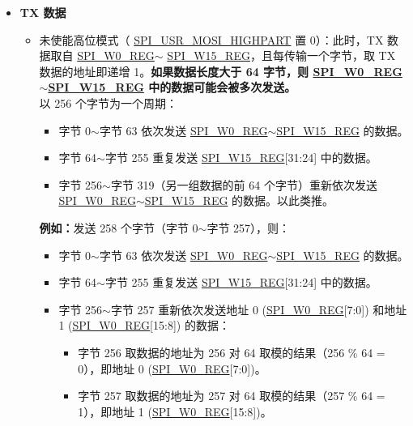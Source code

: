 \documentclass[main\_\_CN.tex]{subfiles}
\begin{document}
\begin{itemize}
    \item \textbf{TX 数据}
    \begin{itemize}
        \item 未使能高位模式（ \hyperref[fielddesc:SPIUSRMOSIHIGHPART]{SPI\_USR\_MOSI\_HIGHPART} 置 0）：此时，TX 数据取自 \hyperref[regdesc:SPIW0REG]{SPI\_W0\_REG}$\sim$ \hyperref[regdesc:SPIW15REG]{SPI\_W15\_REG}，且每传输一个字节，取 TX 数据的地址即递增 1。\textbf{如果数据长度大于 64 字节，则 \hyperref[regdesc:SPIW0REG]{SPI\_W0\_REG}$\sim$\hyperref[regdesc:SPIW15REG]{SPI\_W15\_REG} 中的数据可能会被多次发送。}\\
       以 256 个字节为一个周期：
        \begin{itemize}
            \item 字节 0$\sim$字节 63 依次发送 \hyperref[regdesc:SPIW0REG]{SPI\_W0\_REG}$\sim$\hyperref[regdesc:SPIW0REG]{SPI\_W15\_REG} 的数据。
            \item 字节 64$\sim$字节 255 重复发送 \hyperref[regdesc:SPIW0REG]{SPI\_W15\_REG}[31:24] 中的数据。
            \item 字节 256$\sim$字节 319（另一组数据的前 64 个字节）重新依次发送 \hyperref[regdesc:SPIW0REG]{SPI\_W0\_REG}$\sim$\hyperref[regdesc:SPIW0REG]{SPI\_W15\_REG} 的数据。以此类推。
        \end{itemize}
        \textbf{例如：}发送 258 个字节（字节 0$\sim$字节 257），则：
        \begin{itemize}
            \item 字节 0$\sim$字节 63 依次发送 \hyperref[regdesc:SPIW0REG]{SPI\_W0\_REG}$\sim$\hyperref[regdesc:SPIW0REG]{SPI\_W15\_REG} 的数据。
            \item 字节 64$\sim$字节 255 重复发送 \hyperref[regdesc:SPIW0REG]{SPI\_W15\_REG}[31:24] 中的数据。
            \item 字节 256$\sim$字节 257 重新依次发送地址 0 (\hyperref[regdesc:SPIW0REG]{SPI\_W0\_REG}[7:0]) 和地址 1 (\hyperref[regdesc:SPIW0REG]{SPI\_W0\_REG}[15:8]) 的数据：
                \begin{itemize}
                    \item 字节 256 取数据的地址为 256 对 64 取模的结果（256 \% 64 = 0），即地址 0 (\hyperref[regdesc:SPIW0REG]{SPI\_W0\_REG}[7:0])。
                    \item 字节 257 取数据的地址为 257 对 64 取模的结果（257 \% 64 = 1），即地址 1 (\hyperref[regdesc:SPIW0REG]{SPI\_W0\_REG}[15:8])。
                \end{itemize}

\end{itemize}
\end{itemize}
\end{itemize}
\end{document}
